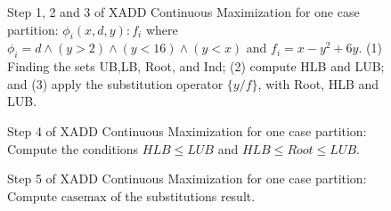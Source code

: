 \documentclass[twoside,11pt]{article}
\newcommand{\casemax}{\mathrm{casemax}}
\newcommand{\Root}{\mathit{Root}}
\begin{document}
\begin{figure}
\begin{minipage}{0.20\linewidth}
 
 
 \vspace{15mm}

 
 
 
 \end{minipage}

 \caption{Step 1, 2 and 3 of XADD Continuous Maximization for one case partition: $\phi_i ( x,d,y): f_i$ where $ \phi_i =  d \wedge ( y > 2 ) \wedge ( y < 16) \wedge ( y < x )$  
 and  $f_i =  x -y^2+6y$. (1) Finding the sets UB,LB, Root, and Ind; (2) compute HLB and LUB; and (3) apply the substitution operator $\{y/f\}$, with Root, HLB and LUB.}
 \label{fig:step123:xadd_max}
 \end{figure}

\begin{figure}
 \centering


 \begin{minipage}{0.35\linewidth}
 \centering
 
 \end{minipage}
\begin{minipage}{0.35\linewidth}
 \centering

 

 \end{minipage}
 \caption{Step 4 of XADD Continuous Maximization for one case partition: Compute the conditions $HLB \leq LUB$ and $HLB \leq \Root \leq LUB$.}
\label{fig:step4:xadd_max}
 \end{figure}
\begin{figure}
 \centering


 \begin{minipage}{0.35\linewidth}
 \centering
 
 \end{minipage}
 \begin{minipage}{0.35\linewidth}
 \centering
 
 \end{minipage}
 \caption{Step 5 of XADD Continuous Maximization for one case partition: Compute $\casemax$ of the substitutions result.}
\label{fig:step5:xadd_max}
 \end{figure}
\end{document}
